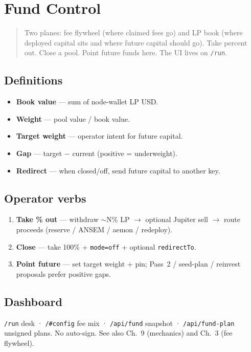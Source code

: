 \chapter{Fund Control}

\begin{quote}
Two planes: fee flywheel (where claimed fees go) and LP book (where deployed capital sits and where future capital should go).
Take percent out. Close a pool. Point future funds here. The UI lives on \texttt{/run}.
\end{quote}

\section{Definitions}

\begin{itemize}
  \item \textbf{Book value} --- sum of node-wallet LP USD.
  \item \textbf{Weight} --- pool value / book value.
  \item \textbf{Target weight} --- operator intent for future capital.
  \item \textbf{Gap} --- target $-$ current (positive = underweight).
  \item \textbf{Redirect} --- when closed/off, send future capital to another key.
\end{itemize}

\section{Operator verbs}

\begin{enumerate}
  \item \textbf{Take \% out} --- withdraw $\sim$N\% LP $\to$ optional Jupiter sell $\to$ route proceeds (reserve / ANSEM / aemon / redeploy).
  \item \textbf{Close} --- take 100\% + \texttt{mode=off} + optional \texttt{redirectTo}.
  \item \textbf{Point future} --- set target weight + pin; Pass~2 / seed-plan / reinvest proposals prefer positive gaps.
\end{enumerate}

\section{Dashboard}

\texttt{/run} desk · \texttt{/#config} fee mix · \texttt{/api/fund} snapshot · \texttt{/api/fund-plan} unsigned plans.
No auto-sign. See also Ch.~9 (mechanics) and Ch.~3 (fee flywheel).
